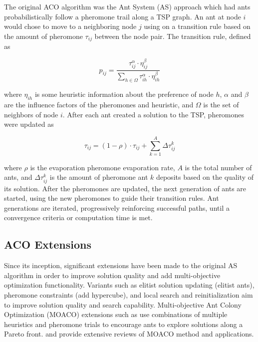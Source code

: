 \documentclass[preprint,12pt,authoryear]{elsarticle}
\begin{document}
The original ACO algorithm was the Ant System (AS) approach \citep{Dorigo1996} which had ants probabilistically follow a pheromone trail along a TSP graph. An ant at node $i$ would chose to move to a neighboring node $j$ using on a transition rule based on the amount of pheromone $\tau_{ij}$ between the node pair. The transition rule, defined as 

\begin{equation}
p_{ij}=\frac{\tau_{ij}^\alpha\cdot\eta_{ij}^\beta}{\sum_{h\in\Omega}
	\tau_{ih}^\alpha\cdot\eta_{ih}^\beta}
\label{eq:AStrans}
\end{equation}

\noindent where $\eta_{ih}$ is some heuristic information about the preference of node $h$, $\alpha$ and $\beta$ are the influence factors of the pheromones and heuristic, and $\Omega$ is the set of neighbors of node $i$. After each ant created a solution to the TSP, pheromones were updated as

\begin{equation}
\tau_{ij}=(1-\rho)\cdot\tau_{ij}+\sum_{k=1}^{A}
	\Delta\tau_{ij}^k
\label{eq:ASup}
\end{equation}

\noindent where $\rho$ is the evaporation pheromone evaporation rate, $A$ is the total number of ants, and $\Delta\tau_{ij}^k$ is the amount of pheromone ant $k$ deposits based on the quality of its solution. After the pheromones are updated, the next generation of ants are started, using the new pheromones to guide their transition rules. Ant generations are iterated, progressively reinforcing successful paths, until a convergence criteria or computation time is met. 

\subsection{ACO Extensions}

Since its inception, significant extensions have been made to the original AS algorithm in order to improve solution quality and add multi-objective optimization functionality. Variants such as elitist solution updating (elitist ants), pheromone constraints \citep{Stutzle2000}(add hypercube), and local search and reinitialization \citep{Ashraf2013} aim to improve solution quality and search capability. Multi-objective Ant Colony Optimization (MOACO) extensions such as \citep{Angus2009,Iredi2001} use combinations of multiple heuristics and pheromone trials to encourage ants to explore solutions along a Pareto front. \cite{Garcia-Martinez2007} and \cite{Rada-Vilela2013} provide extensive reviews of MOACO method and applications. 
\end{document}
